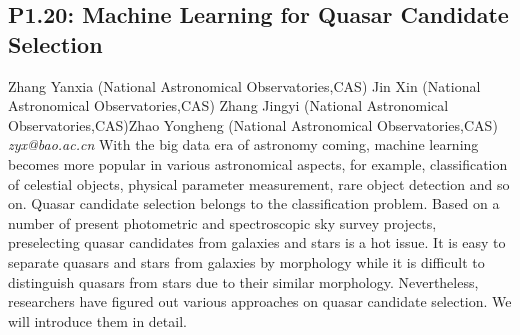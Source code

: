 \documentclass{report}
\begin{document}
\subsection*{P1.20: Machine Learning for Quasar Candidate Selection}
\bigskip
Zhang Yanxia (National Astronomical Observatories,CAS) \newline Jin Xin (National Astronomical Observatories,CAS) \newline  Zhang Jingyi (National Astronomical Observatories,CAS)\newline  Zhao Yongheng (National Astronomical Observatories,CAS)\newline  \newline  \newline\newline
{\it zyx@bao.ac.cn}\newline
\newline\newline
With the big data era of astronomy coming, machine learning becomes more popular in various astronomical aspects, for example, classification of celestial objects, physical parameter measurement, rare object detection and so on. Quasar candidate selection belongs to the classification problem. Based on a number of present photometric and spectroscopic sky survey projects, preselecting quasar candidates from galaxies and stars is a hot issue. It is easy to separate quasars and stars from galaxies by morphology while it is difficult to distinguish quasars from stars due to their similar morphology. Nevertheless, researchers have figured out various approaches on quasar candidate selection. We will introduce them in detail.\newline
\newpage
\end{document}
